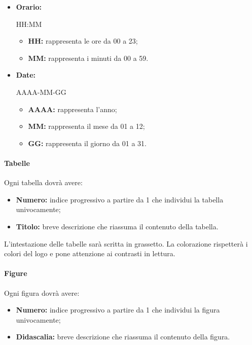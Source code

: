 \documentclass[11pt,a4paper]{article}
\begin{document}
{	\begin{itemize}
		\item \textbf{Orario:} 
		\begin{center}
			HH:MM
		\end{center}
		\begin{itemize}
			\item \textbf{HH:} rappresenta le ore da 00 a 23;
			\item \textbf{MM:} rappresenta i minuti da 00 a 59.
		\end{itemize} 
		
		\item \textbf{Date:}
		\begin{center}
			AAAA-MM-GG
		\end{center}
		\begin{itemize}
			\item \textbf{AAAA:} rappresenta l'anno;
			\item \textbf{MM:} rappresenta il mese da 01 a 12;
			\item \textbf{GG:} rappresenta il giorno da 01 a 31.
		\end{itemize}
		
	\end{itemize}
	
	\paragraph{Tabelle\\}	
	Ogni tabella dovrà avere:
	\begin{itemize}
		\item \textbf{Numero:} indice progressivo a partire da 1 che individui la tabella univocamente;
		\item \textbf{Titolo:} breve descrizione che riassuma il contenuto della tabella.
	\end{itemize}
	L'intestazione delle tabelle sarà scritta in grassetto. La colorazione rispetterà i colori del logo e pone attenzione ai contrasti in lettura.
	
	
	
	\paragraph{Figure\\}
	Ogni figura dovrà avere:
	\begin{itemize}
		\item \textbf{Numero:} indice progressivo a partire da 1 che individui la figura univocamente;
		\item \textbf{Didascalia:} breve descrizione che riassuma il contenuto della figura.
	\end{itemize}
	
}
\end{document}
